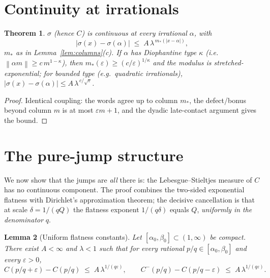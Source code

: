 \documentclass[11pt]{article}
\newtheorem{theorem}{Theorem}
\newtheorem{lemma}[theorem]{Lemma}
\theoremstyle{definition}
\theoremstyle{remark}
\newcommand{\dnorm}[1]{\left\| #1 \right\|}
\begin{document}
\section{Continuity at irrationals}

\begin{theorem}\label{thm:irrational}
$\sigma$ (hence $C$) is continuous at every irrational $\alpha$, with
\[
|\sigma(x) - \sigma(\alpha)| \;\leq\; A\,\lambda^{\,m_*(|x - \alpha|)},
\]
$m_*$ as in Lemma~\ref{lem:columns}(c).
If $\alpha$ has Diophantine type $\kappa$ (i.e.\
$\dnorm{\alpha m} \geq c\,m^{1-\kappa}$), then
$m_*(\varepsilon) \geq (c/\varepsilon)^{1/\kappa}$ and the modulus is
stretched-exponential; for bounded type (e.g.\ quadratic irrationals),
$|\sigma(x) - \sigma(\alpha)| \leq A\,\lambda^{\,c/\sqrt{\varepsilon}}$.
\end{theorem}

\begin{proof}
Identical coupling: the words agree up to column $m_*$, the defect/bonus
beyond column $m$ is at most $\varepsilon m + 1$, and the dyadic
late-contact argument gives the bound.
\end{proof}

\section{The pure-jump structure}

We now show that the jumps are \emph{all} there is: the
Lebesgue--Stieltjes measure of $C$ has no continuous component.
The proof combines the two-sided exponential flatness with Dirichlet's
approximation theorem; the decisive cancellation is that at scale
$\delta = 1/(qQ)$ the flatness exponent $1/(q\delta)$ equals $Q$,
\emph{uniformly in the denominator} $q$.

\begin{lemma}[Uniform flatness constants]\label{lem:uniform}
Let $[\alpha_0, \beta_0] \subset (1, \infty)$ be compact.
There exist $A < \infty$ and $\lambda < 1$ such that for every rational
$p/q \in [\alpha_0, \beta_0]$ and every $\varepsilon > 0$,
\[
C(p/q + \varepsilon) - C(p/q) \;\leq\; A\,\lambda^{1/(q\varepsilon)},
\qquad
C^-(p/q) - C(p/q - \varepsilon) \;\leq\; A\,\lambda^{1/(q\varepsilon)} .
\]
\end{lemma}
\end{document}
